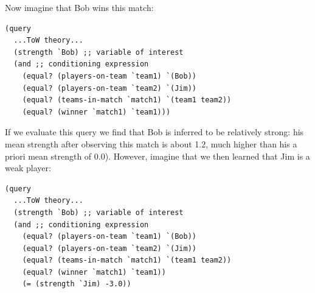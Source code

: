 \documentclass[pdfextras]{handbook}
\begin{document}
Now imagine that Bob wins this match:
\begin{lstlisting}[mathescape]
(query
  ...ToW theory...
  (strength `Bob) ;; variable of interest 
  (and ;; conditioning expression
    (equal? (players-on-team `team1) `(Bob))
    (equal? (players-on-team `team2) `(Jim))
    (equal? (teams-in-match `match1) `(team1 team2))
    (equal? (winner `match1) `team1)))
\end{lstlisting}
If we evaluate this query we find that Bob is inferred to be relatively strong: his mean strength after observing this match is about 1.2, much higher than his a priori mean strength of $0.0$). 
However, imagine that we then learned that Jim is a weak player:
 \begin{lstlisting}[mathescape]
(query
  ...ToW theory...
  (strength `Bob) ;; variable of interest 
  (and ;; conditioning expression
    (equal? (players-on-team `team1) `(Bob))
    (equal? (players-on-team `team2) `(Jim))
    (equal? (teams-in-match `match1) `(team1 team2))
    (equal? (winner `match1) `team1))
    (= (strength `Jim) -3.0))
\end{lstlisting}
\end{document}
